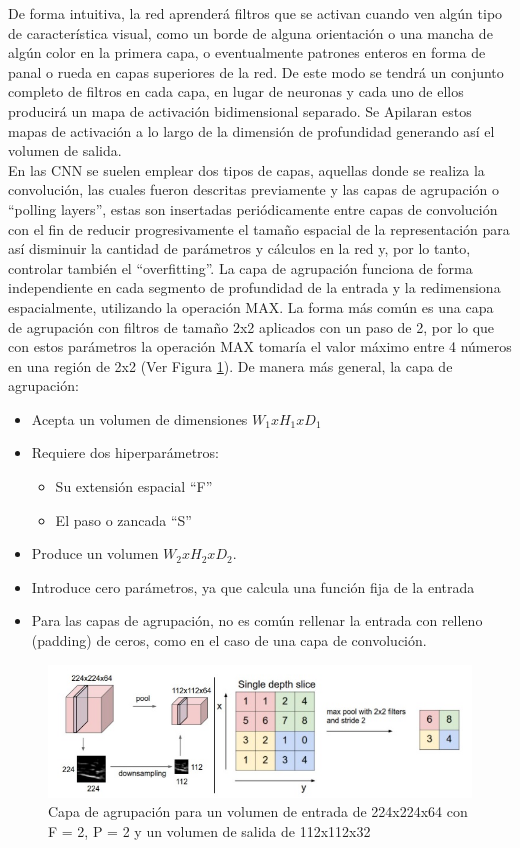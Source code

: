 De forma intuitiva, la red aprenderá filtros que se activan cuando ven algún tipo de característica visual, como un borde de alguna orientación o una mancha de algún color en la primera capa, o eventualmente patrones enteros en forma de panal o rueda en capas superiores de la red. De este modo se tendrá un conjunto completo de filtros en cada capa, en lugar de neuronas y cada uno de ellos producirá un mapa de activación bidimensional separado. Se Apilaran estos mapas de activación a lo largo de la dimensión de profundidad generando así el volumen de salida\cite{CS231n}.
\\ 
En las CNN se suelen emplear dos tipos de capas, aquellas donde se realiza la convolución, las cuales fueron descritas previamente y las capas de agrupación o ``polling layers'', estas son insertadas periódicamente entre capas de convolución con el fin de reducir progresivamente el tamaño espacial de la representación para así disminuir la cantidad de parámetros y cálculos en la red y, por lo tanto, controlar también el ``overfitting''. La capa de agrupación funciona de forma independiente en cada segmento de profundidad de la entrada y la redimensiona espacialmente, utilizando la operación MAX. La forma más común es una capa de agrupación con filtros de tamaño 2x2 aplicados con un paso de 2, por lo que con estos parámetros la operación MAX tomaría el valor máximo entre 4 números en una región de 2x2 (Ver Figura \ref{maxPooling}). De manera más general, la capa de agrupación:
\begin{itemize}
    \item Acepta un volumen de dimensiones $W_{1}xH_{1}xD_{1}$
    \item Requiere dos hiperparámetros:
    \begin{itemize}
        \item Su extensión espacial ``F''
        \item El paso o zancada ``S''
    \end{itemize}
    \item Produce un volumen $W_{2}xH_{2}xD_{2}$.
    \item Introduce cero parámetros, ya que calcula una función fija de la entrada
    \item Para las capas de agrupación, no es común rellenar la entrada con relleno (padding) de ceros, como en el caso de una capa de convolución.
\end{itemize}
\begin{figure}[H]
    \centering
    \includegraphics[scale=0.6]{Recursos/maxPolling.jpg}
    \caption{Capa de agrupación para un volumen de entrada de 224x224x64 con F = 2, P = 2 y un volumen de salida de 112x112x32}
    \label{maxPooling}
\end{figure}
